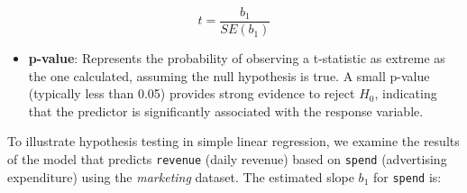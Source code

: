 \documentclass[
  11pt,
]{book}
\providecommand{\tightlist}{%
  \setlength{\itemsep}{0pt}\setlength{\parskip}{0pt}}
\theoremstyle{definition}
\theoremstyle{definition}
\theoremstyle{definition}
\theoremstyle{definition}
\theoremstyle{remark}
\begin{document}
\[
t = \frac{b_1}{SE(b_1)}
\]

\begin{itemize}
\tightlist
\item
  \textbf{p-value}: Represents the probability of observing a t-statistic as extreme as the one calculated, assuming the null hypothesis is true. A small p-value (typically less than 0.05) provides strong evidence to reject \(H_0\), indicating that the predictor is significantly associated with the response variable.
\end{itemize}

To illustrate hypothesis testing in simple linear regression, we examine the results of the model that predicts \texttt{revenue} (daily revenue) based on \texttt{spend} (advertising expenditure) using the \emph{marketing} dataset. The estimated slope \(b_1\) for \texttt{spend} is:
\end{document}
